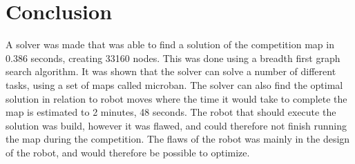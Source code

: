 \section{Conclusion}
A solver was made that was able to find a solution of the competition map in 0.386 seconds, creating 33160 nodes.
This was done using a breadth first graph search algorithm. 
It was shown that the solver can solve a number of different tasks, using a set of maps called microban. 
The solver can also find the optimal solution in relation to robot moves where the time it would take to complete the map is estimated to 2 minutes, 48 seconds.
The robot that should execute the solution was build, however it was flawed, and could therefore not finish running the map during the competition.
The flaws of the robot was mainly in the design of the robot, and would therefore be possible to optimize. 